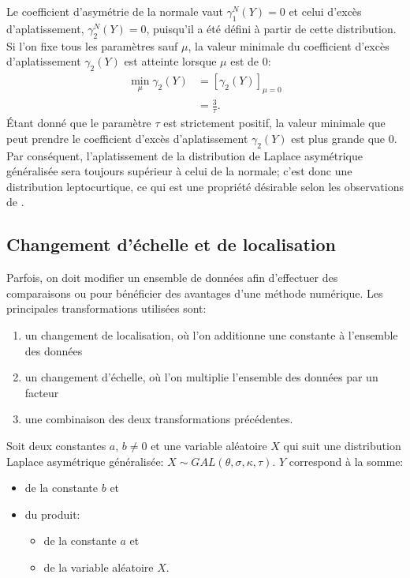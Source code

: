 Le coefficient d'asymétrie de la normale vaut $\gamma_1^N(Y)=0$ et
celui d'excès d'aplatissement, $\gamma_2^N(Y)=0$, puisqu'il a été
défini à partir de cette distribution. Si l'on fixe tous les
paramètres sauf $\mu$, la valeur minimale du coefficient d'excès
d'aplatissement $\gamma_2(Y)$ est atteinte lorsque $\mu$ est de 0:
\begin{align*}
  \min_{\mu} \gamma_2(Y) &= \left[\gamma_2(Y)\right]_{\mu=0} \\
  &= \frac{3}{\tau}.
\end{align*}
Étant donné que le paramètre $\tau$ est strictement positif, la valeur
minimale que peut prendre le coefficient d'excès d'aplatissement
$\gamma_2(Y)$ est plus grande que 0. Par conséquent, l'aplatissement de la
distribution de Laplace asymétrique généralisée sera toujours
supérieur à celui de la normale; c'est donc une distribution
leptocurtique, ce qui est une propriété désirable selon les
observations de \cite{madan1990variance}.

\subsection{Changement d'échelle et de localisation}
\label{sec:transGAL}

Parfois, on doit modifier un ensemble de données afin d'effectuer des
comparaisons ou pour bénéficier des avantages d'une méthode
numérique. Les principales transformations utilisées sont:
\begin{enumerate}
\item un changement de localisation, où l'on additionne une constante
  à l'ensemble des données
\item un changement d'échelle, où l'on multiplie l'ensemble des
  données par un facteur
\item une combinaison des deux transformations précédentes.
\end{enumerate}

Soit deux constantes $a$, $b\neq0$ et une variable aléatoire $X$ qui
suit une distribution Laplace asymétrique généralisée: $X \sim
GAL(\theta,\sigma,\kappa,\tau)$. $Y$ correspond à la somme:
\begin{itemize}
\item de la constante $b$ et
\item du produit:
  \begin{itemize}
  \item de la constante $a$ et
  \item de la variable aléatoire $X$.
  \end{itemize}
\end{itemize}


